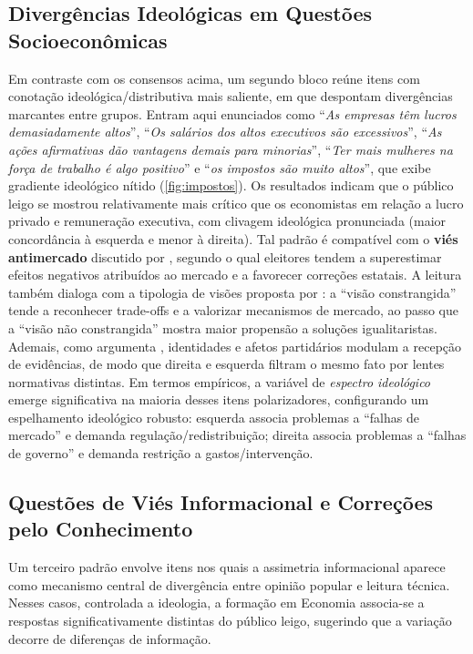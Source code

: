 \subsection{Divergências Ideológicas em Questões Socioeconômicas}
Em contraste com os consensos acima, um segundo bloco reúne itens com conotação ideológica/distributiva mais saliente, em que despontam divergências marcantes entre grupos. Entram aqui enunciados como ``\textit{As empresas têm lucros demasiadamente altos}'', ``\textit{Os salários dos altos executivos são excessivos}'', ``\textit{As ações afirmativas dão vantagens demais para minorias}'', ``\textit{Ter mais mulheres na força de trabalho é algo positivo}'' e “\textit{os impostos são muito altos}”, que exibe gradiente ideológico nítido (\autoref{fig:impostos}). Os resultados indicam que o público leigo se mostrou relativamente mais crítico que os economistas em relação a lucro privado e remuneração executiva, com clivagem ideológica pronunciada (maior concordância à esquerda e menor à direita). Tal padrão é compatível com o \textbf{viés antimercado} discutido por , segundo o qual eleitores tendem a superestimar efeitos negativos atribuídos ao mercado e a favorecer correções estatais. A leitura também dialoga com a tipologia de visões proposta por : a ``visão constrangida'' tende a reconhecer trade-offs e a valorizar mecanismos de mercado, ao passo que a ``visão não constrangida'' mostra maior propensão a soluções igualitaristas. Ademais, como argumenta , identidades e afetos partidários modulam a recepção de evidências, de modo que direita e esquerda filtram o mesmo fato por lentes normativas distintas. Em termos empíricos, a variável de \textit{espectro ideológico} emerge significativa na maioria desses itens polarizadores, configurando um espelhamento ideológico robusto: esquerda associa problemas a ``falhas de mercado'' e demanda regulação/redistribuição; direita associa problemas a ``falhas de governo'' e demanda restrição a gastos/intervenção.

\subsection{Questões de Viés Informacional e Correções pelo Conhecimento}
Um terceiro padrão envolve itens nos quais a assimetria informacional aparece como mecanismo central de divergência entre opinião popular e leitura técnica. Nesses casos, controlada a ideologia, a formação em Economia associa-se a respostas significativamente distintas do público leigo, sugerindo que a variação decorre de diferenças de informação.

